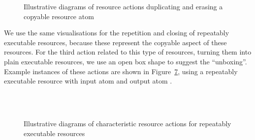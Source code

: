 \documentclass[class=smolathesis,crop=false]{standalone}
\begin{document}
\begin{figure}[h]
  \begin{subfigure}{0.49\textwidth}
    \centering
    
    \caption{}
    \label{fig:process-diagrams/Duplicate}
  \end{subfigure}
  \begin{subfigure}{0.49\textwidth}
    \centering
    
    \caption{}
    \label{fig:process-diagrams/Erase}
  \end{subfigure}
  \caption{Illustrative diagrams of resource actions duplicating and erasing a copyable resource atom}
    \label{fig:process-diagrams/Duplicate+Erase}
\end{figure}

\cbstart
We use the same visualisations for the repetition and closing of repeatably executable resources, because these represent the copyable aspect of these resources.
For the third action related to this type of resources, turning them into plain executable resources, we use an open box shape to suggest the ``unboxing''.
Example instances of these actions are shown in Figure~\ref{fig:process-diagrams/Repeat+Close+Once}, using a repeatably executable resource with input atom  and output atom .
\cbend

\begin{figure}[h]
  \begin{subfigure}{0.49\textwidth}
    \centering
    
    \caption{}
    \label{fig:process-diagrams/Repeat}
  \end{subfigure}
  \begin{subfigure}{0.49\textwidth}
    \centering
    
    \caption{}
    \label{fig:process-diagrams/Close}
  \end{subfigure}
  \\~\\
  \begin{subfigure}{\textwidth}
    \centering
    
    \caption{}
    \label{fig:process-diagrams/Once}
  \end{subfigure}
  \caption{Illustrative diagrams of characteristic resource actions for repeatably executable resources}
  \label{fig:process-diagrams/Repeat+Close+Once}
\end{figure}
\end{document}
